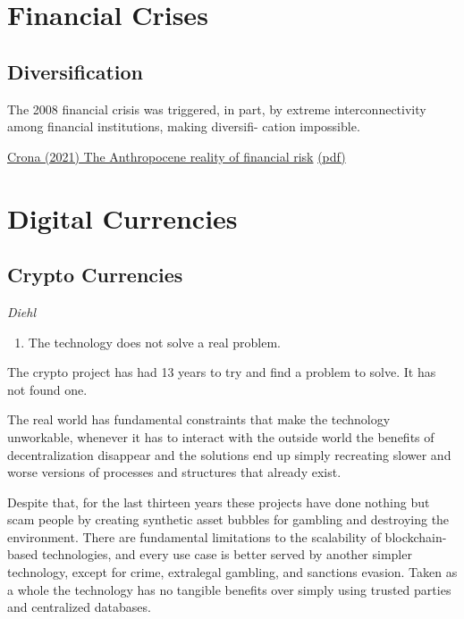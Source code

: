 \documentclass[
]{book}
\providecommand{\tightlist}{%
  \setlength{\itemsep}{0pt}\setlength{\parskip}{0pt}}
\begin{document}
\hypertarget{financial-crises}{%
\chapter{Financial Crises}\label{financial-crises}}

\hypertarget{diversification}{%
\section{Diversification}\label{diversification}}

The 2008 financial crisis was triggered, in part, by extreme
interconnectivity among financial institutions, making diversifi-
cation impossible.

\href{https://www.sciencedirect.com/science\%20/article/pii/S2590332221002359\#undfig1}{Crona (2021) The Anthropocene reality of financial risk}
\href{pdf/Crona_2021_Anthropocene_reality_of\%20Financial_Risk.pdf}{(pdf)}

\hypertarget{digital-currencies}{%
\chapter{Digital Currencies}\label{digital-currencies}}

\hypertarget{crypto-currencies}{%
\section{Crypto Currencies}\label{crypto-currencies}}

\emph{Diehl}

\begin{enumerate}
\def\labelenumi{\arabic{enumi}.}
\tightlist
\item
  The technology does not solve a real problem.
\end{enumerate}

The crypto project has had 13 years to try and find a problem to solve. It has not found one.

The real world has fundamental constraints that make the technology unworkable, whenever it has to interact with the outside world the benefits of decentralization disappear and the solutions end up simply recreating slower and worse versions of processes and structures that already exist.

Despite that, for the last thirteen years these projects have done nothing but scam people by creating synthetic asset bubbles for gambling and destroying the environment. There are fundamental limitations to the scalability of blockchain-based technologies, and every use case is better served by another simpler technology, except for crime, extralegal gambling, and sanctions evasion. Taken as a whole the technology has no tangible benefits over simply using trusted parties and centralized databases.
\end{document}

